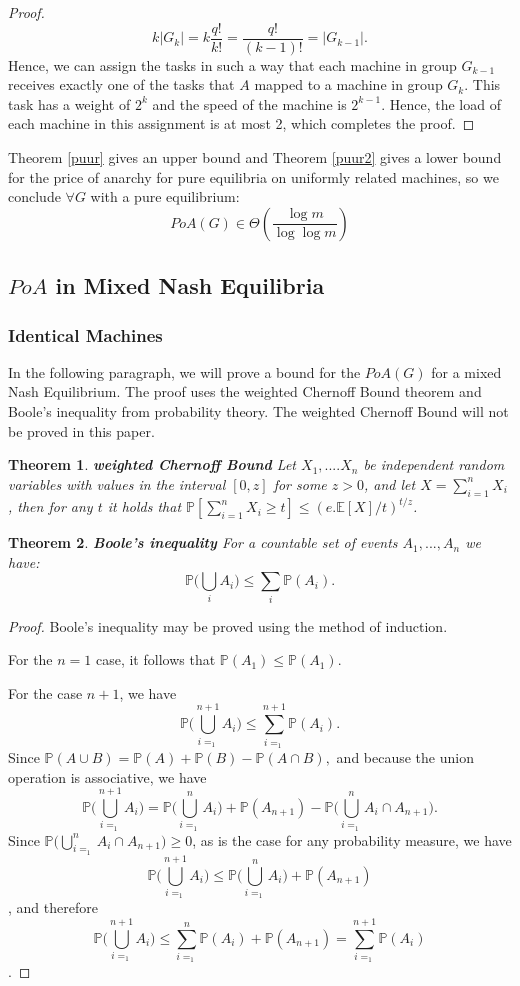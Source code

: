 \documentclass[a4paper,11pt]{article}
\newtheorem{theorem}{Theorem}[section]
\renewcommand{\P}{{\mathbb P}}
\newcommand{\E}{{\mathbb E}}
\begin{document}
\begin{proof}
$$k|G_k| = k\frac{q!}{k!} = \frac{q!}{(k-1)!}= |G_{k-1}|.$$
Hence, we can assign the tasks in such a way that each machine in group $G_{k-1}$ receives exactly one of the tasks that $A$ mapped to a machine in group $G_k$. This task has a weight of $2^k$ and the speed of the machine is $2^{k-1}$. Hence, the load of each machine in this assignment is at most 2, which completes the proof.
\end{proof}
Theorem \ref{puur} gives an upper bound and Theorem \ref{puur2} gives a lower bound  for the price of anarchy for pure equilibria on uniformly related machines, so we conclude $\forall G$ with a pure equilibrium:
$$PoA(G) \in \Theta\left(\frac{\log m}{\log \log m}\right)$$



\subsection{$PoA$ in Mixed Nash Equilibria}
\subsubsection {Identical Machines}
In the following paragraph, we will prove a bound for the $PoA(G)$ for a mixed Nash Equilibrium. The proof uses the weighted Chernoff Bound theorem and Boole's inequality from probability theory. The weighted Chernoff Bound will not be proved in this paper.
\begin{theorem}\textbf{weighted Chernoff Bound}
Let $X_1,....X_n$ be independent random variables with values in the interval $[0,z]$ for some $z > 0$, and let $X = \sum^n_{i=1}X_i$, then for any $t$ it holds that $\P[\sum^n_{i=1}X_i\geq t] \leq (e.\E[X]/t)^{t/z}$.
\end{theorem}

\begin{theorem}\textbf{Boole's inequality}\cite{13}
For a countable set of events $A_1,...,A_n$ we have:
$$ \P\biggl(\bigcup_{i} A_i\biggr) \le \sum_i \P(A_i).$$
\end{theorem}
\begin{proof}
Boole's inequality may be proved using the method of induction.

For the $n=1$ case, it follows that
$\mathbb P(A_1) \le \mathbb P(A_1).$

For the case $n + 1$, we have
$$\P\biggl(\bigcup_{i=_1}^{n+1} A_i\biggr) \le \sum_{i=_1}^{n+1} \P(A_i).$$
Since $\mathbb P(A \cup B) = \mathbb P(A) + \mathbb P(B) - \mathbb P(A \cap B),$ and because the union operation is associative, we have
$$\P\biggl(\bigcup_{i=_1}^{n+1} A_i\biggr) = \P\biggl(\bigcup_{i=_1}^n A_i\biggr) + \mathbb P(A_{n+1}) - \P\biggl(\bigcup_{i=_1}^n A_i \cap A_{n+1}\biggr).$$
Since $\P\biggl(\bigcup_{i=_1}^n A_i \cap A_{n+1}\biggr) \ge 0$, as is the case for any probability measure, we have
$$\P\biggl(\bigcup_{i=_1}^{n+1} A_i\biggr) \le \P\biggl(\bigcup_{i=_1}^n A_i\biggr) + \mathbb P(A_{n+1})$$,
and therefore
$$\P\biggl(\bigcup_{i=_1}^{n+1} A_i\biggr) \le \sum_{i=_1}^{n} \P(A_i) + \mathbb P(A_{n+1}) = \sum_{i=_1}^{n+1} \P(A_i)$$.
\end{proof}
\end{document}
